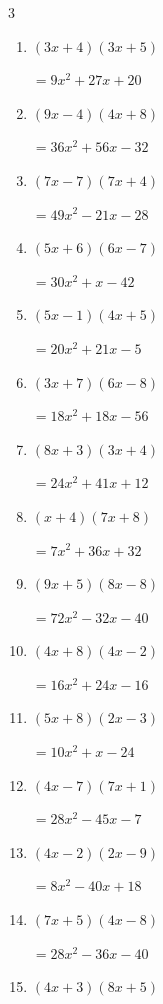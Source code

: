\begin{multicols}{3}
\begin{enumerate}
        $=8x^{2}-25x+18$

\columnbreak %

  \item $(3x+4)(3x+5)$

        $=9x^{2}+27x+20$

  \item $(9x-4)(4x+8)$

        $=36x^{2}+56x-32$

  \item $(7x-7)(7x+4)$

        $=49x^{2}-21x-28$

  \item $(5x+6)(6x-7)$

        $=30x^{2}+x-42$

  \item $(5x-1)(4x+5)$

        $=20x^{2}+21x-5$

  \item $(3x+7)(6x-8)$

        $=18x^{2}+18x-56$

  \item $(8x+3)(3x+4)$

        $=24x^{2}+41x+12$

  \item $(x+4)(7x+8)$

        $=7x^{2}+36x+32$

  \item $(9x+5)(8x-8)$

        $=72x^{2}-32x-40$

  \item $(4x+8)(4x-2)$

        $=16x^{2}+24x-16$

  \item $(5x+8)(2x-3)$

        $=10x^{2}+x-24$

  \item $(4x-7)(7x+1)$

        $=28x^{2}-45x-7$

  \item $(4x-2)(2x-9)$

        $=8x^{2}-40x+18$

  \item $(7x+5)(4x-8)$

        $=28x^{2}-36x-40$

  \item $(4x+3)(8x+5)$


\end{enumerate}
\end{multicols}
